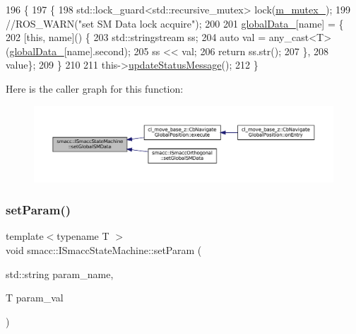 \begin{DoxyCode}
196 \{
197     \{
198         std::lock\_guard<std::recursive\_mutex> lock(\hyperlink{classsmacc_1_1ISmaccStateMachine_aac785541646e5c517273bf31072505a1}{m\_mutex\_});
199         \textcolor{comment}{//ROS\_WARN("set SM Data lock acquire");}
200 
201         \hyperlink{classsmacc_1_1ISmaccStateMachine_ad2f9dae184ea942db632ac4532a10a91}{globalData\_}[name] = \{
202             [\textcolor{keyword}{this}, name]() \{
203                 std::stringstream ss;
204                 \textcolor{keyword}{auto} val = any\_cast<T>(\hyperlink{classsmacc_1_1ISmaccStateMachine_ad2f9dae184ea942db632ac4532a10a91}{globalData\_}[name].second);
205                 ss << val;
206                 \textcolor{keywordflow}{return} ss.str();
207             \},
208             value\};
209     \}
210 
211     this->\hyperlink{classsmacc_1_1ISmaccStateMachine_ad246a49015fadaeb0b1639d7ab99f7d0}{updateStatusMessage}();
212 \}
\end{DoxyCode}
Here is the caller graph for this function\+:
\nopagebreak
\begin{figure}[H]
\begin{center}
\leavevmode
\includegraphics[width=350pt]{classsmacc_1_1ISmaccStateMachine_a8588f9e580fbb95b53e2bd2ca3ff1f98_icgraph}
\end{center}
\end{figure}
\mbox{\label{classsmacc_1_1ISmaccStateMachine_afc730437f45fa107292c078dfab2aa37}} 
\subsubsection{\texorpdfstring{set\+Param()}{setParam()}}
{\footnotesize\ttfamily template$<$typename T $>$ \\
void smacc\+::\+I\+Smacc\+State\+Machine\+::set\+Param (\begin{DoxyParamCaption}\item[{std\+::string}]{param\+\_\+name,  }\item[{T}]{param\+\_\+val }\end{DoxyParamCaption})\hspace{0.3cm}{\ttfamily [protected]}}



